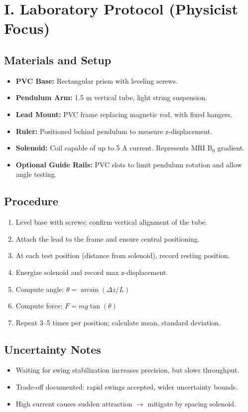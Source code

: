\section{I. Laboratory Protocol (Physicist Focus)}
\subsection*{Materials and Setup}
\begin{itemize}
	\item \textbf{PVC Base:} Rectangular prism with leveling screws.
	\item \textbf{Pendulum Arm:} 1.5 m vertical tube, light string suspension.
	\item \textbf{Lead Mount:} PVC frame replacing magnetic rod, with fixed hangers.
	\item \textbf{Ruler:} Positioned behind pendulum to measure z-displacement.
	\item \textbf{Solenoid:} Coil capable of up to 5 A current. Represents MRI B$_0$ gradient.
	\item \textbf{Optional Guide Rails:} PVC slots to limit pendulum rotation and allow angle testing.
\end{itemize}

\subsection*{Procedure}
\begin{enumerate}
	\item Level base with screws; confirm vertical alignment of the tube.
	\item Attach the lead to the frame and ensure central positioning.
	\item At each test position (distance from solenoid), record resting position.
	\item Energize solenoid and record max z-displacement.
	\item Compute angle: $\theta = \arcsin(\Delta z / L)$
	\item Compute force: $F = mg \tan(\theta)$
	\item Repeat 3--5 times per position; calculate mean, standard deviation.
\end{enumerate}

\subsection*{Uncertainty Notes}
\begin{itemize}
	\item Waiting for swing stabilization increases precision, but slows throughput.
	\item Trade-off documented: rapid swings accepted, wider uncertainty bounds.
	\item High current causes sudden attraction $\rightarrow$ mitigate by spacing solenoid.
\end{itemize}

